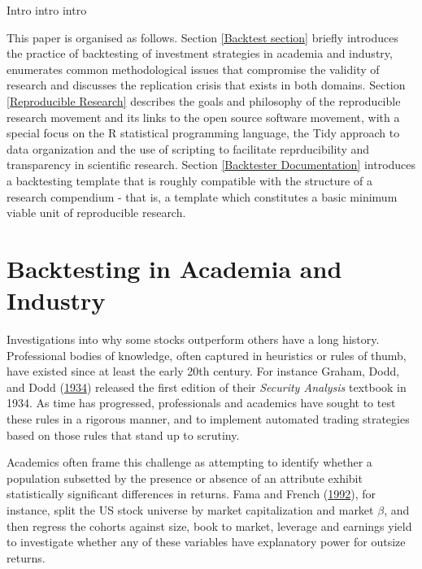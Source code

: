 \documentclass[11pt,preprint, authoryear]{elsarticle}
\numberwithin{equation}{section}
\numberwithin{figure}{section}
\numberwithin{table}{section}
\begin{document}
Intro intro intro

This paper is organised as follows. Section \ref{Backtest section}
briefly introduces the practice of backtesting of investment strategies
in academia and industry, enumerates common methodological issues that
compromise the validity of research and discusses the replication crisis
that exists in both domains. Section \ref{Reproducible Research}
describes the goals and philosophy of the reproducible research movement
and its links to the open source software movement, with a special focus
on the R statistical programming language, the Tidy approach to data
organization and the use of scripting to facilitate reprducibility and
transparency in scientific research. Section
\ref{Backtester Documentation} introduces a backtesting template that is
roughly compatible with the structure of a research compendium - that
is, a template which constitutes a basic minimum viable unit of
reproducible research.

\pagebreak

\section{\texorpdfstring{Backtesting in Academia and
Industry\label{Backtest section}}{Backtesting in Academia and Industry}}\label{backtesting-in-academia-and-industry}

Investigations into why some stocks outperform others have a long
history. Professional bodies of knowledge, often captured in heuristics
or rules of thumb, have existed since at least the early 20th century.
For instance Graham, Dodd, and Dodd
(\protect\hyperlink{ref-Graham1934a}{1934}) released the first edition
of their \emph{Security Analysis} textbook in 1934. As time has
progressed, professionals and academics have sought to test these rules
in a rigorous manner, and to implement automated trading strategies
based on those rules that stand up to scrutiny.

Academics often frame this challenge as attempting to identify whether a
population subsetted by the presence or absence of an attribute exhibit
statistically significant differences in returns. Fama and French
(\protect\hyperlink{ref-Fama1992}{1992}), for instance, split the US
stock universe by market capitalization and market \(\beta\), and then
regress the cohorts against size, book to market, leverage and earnings
yield to investigate whether any of these variables have explanatory
power for outsize returns.
\end{document}
